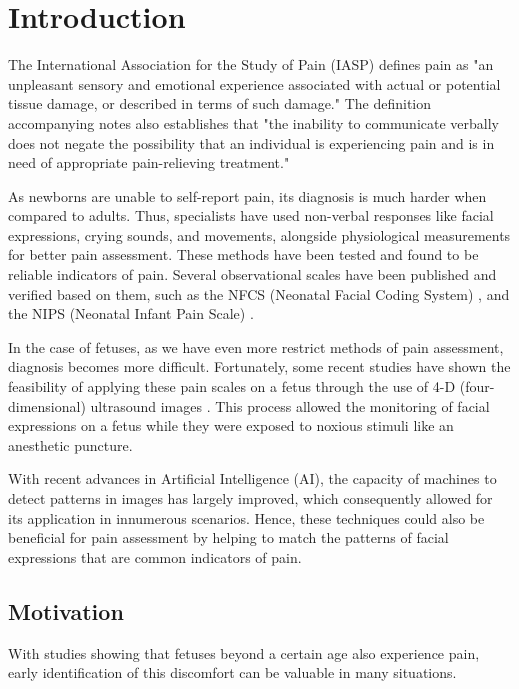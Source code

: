 \chapter{Introduction}

The International Association for the Study of Pain (IASP) defines pain as "an unpleasant sensory and emotional experience associated with actual or potential tissue damage, or described in terms of such damage." \citep{merskey1994classification} The definition accompanying notes also establishes that "the inability to communicate verbally does not negate the possibility that an individual is experiencing pain and is in need of appropriate pain-relieving treatment."

As newborns are unable to self-report pain, its diagnosis is much harder when compared to adults. Thus, specialists have used non-verbal responses like facial expressions, crying sounds, and movements, alongside physiological measurements for better pain assessment. These methods have been tested and found to be reliable indicators of pain. Several observational scales have been published and verified based on them, such as the NFCS (Neonatal Facial Coding System) \citep{Grunau1998}, and the NIPS (Neonatal Infant Pain Scale) \citep{HudsonBarr2002}.

In the case of fetuses, as we have even more restrict methods of pain assessment, diagnosis becomes more difficult. Fortunately, some recent studies have shown the feasibility of applying these pain scales on a fetus through the use of 4-D (four-dimensional) ultrasound images \citep{bernardes2018feasibility}. This process allowed the monitoring of facial expressions on a fetus while they were exposed to noxious stimuli like an anesthetic puncture.

With recent advances in Artificial Intelligence (AI), the capacity of machines to detect patterns in images has largely improved, which consequently allowed for its application in innumerous scenarios. Hence, these techniques could also be beneficial for pain assessment by helping to match the patterns of facial expressions that are common indicators of pain.

\section{Motivation}

With studies showing that fetuses beyond a certain age also experience pain, early identification of this discomfort can be valuable in many situations.

